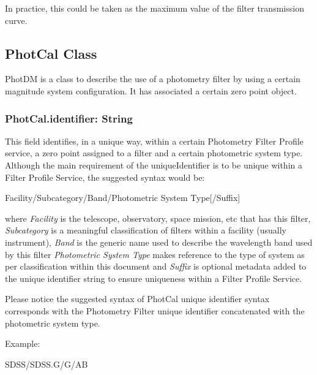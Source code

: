 \documentclass[11pt,a4paper]{ivoa}
\begin{document}
In practice, this could be taken as the maximum value of the filter transmission
curve.\par

\subsection{PhotCal Class}
PhotDM is a class to describe the use of a photometry filter by using a certain magnitude system
configuration. It has associated a certain zero point object.
\par

\subsubsection{PhotCal.identifier: String}
This field identifies, in a unique way, within a certain Photometry Filter Profile
service, a zero point assigned to a filter and a certain photometric system type.
Although the main requirement of the uniqueIdentifier is to be unique within a Filter
Profile Service, the suggested syntax would be:
\par

Facility/Subcategory/Band/Photometric System Type[/Suffix]
\bigskip


where \textit{Facility} is the telescope, observatory, space mission, etc that
has this filter, \textit{Subcategory} is a meaningful classification of filters
within a facility (usually instrument), \textit{Band} is the generic name used to
describe the wavelength band used by this filter \textit{Photometric System Type}
makes reference to the type of system as per classification within this document
and \textit{Suffix} is optional metadata added to the unique identifier string to
ensure uniqueness within a Filter Profile Service.
\par

Please notice the suggested syntax of PhotCal unique identifier syntax corresponds
with the Photometry Filter unique identifier concatenated with the photometric
system type.
\par

Example:
\par



SDSS/SDSS.G/G/AB
\bigskip


\end{document}
